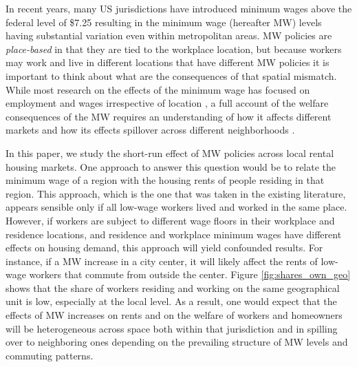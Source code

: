 

In recent years, many US jurisdictions have introduced minimum wages above the 
federal level of \$7.25 resulting in the minimum wage (hereafter MW) levels having substantial 
variation even within metropolitan areas. %
MW policies are \textit{place-based} in that they are tied to the workplace location, but
because workers may work and live in different locations that have different MW policies
it is important to think about what are the consequences of that spatial mismatch.
While most research on the effects of the minimum wage has focused on employment 
and wages irrespective of location 
\parencite[e.g.,][]{CardKrueger1994, AutorEtAl2016, CegnizEtAl2019}, 
a full account of the welfare consequences of the MW requires an 
understanding of how it affects different markets and how its effects spillover 
across different neighborhoods \parencite[as recently emphasized by][]{DubeLindner2021}.

In this paper, we study the short-run effect of MW policies across 
local rental housing markets.
One approach to answer this question would be to relate the minimum wage of a region
with the housing rents of people residing in that region.
This approach, which is the one that was taken in the existing literature, appears 
sensible only if all low-wage workers lived and worked in the same place.
However, if workers are subject to different wage floors in their workplace and
residence locations, and residence and workplace minimum wages have different 
effects on housing demand, this approach will yield confounded results.
For instance, if a MW increase in a city center, it will likely affect 
the rents of low-wage workers that commute from outside the center.
Figure \ref{fig:shares_own_geo} shows that the share of workers residing and working 
on the same geographical unit is low, especially at the local level.
As a result, one would expect that the effects of MW increases on rents and 
on the welfare of workers and homeowners will be heterogeneous across space both within 
that jurisdiction and in spilling over to neighboring ones depending on the prevailing 
structure of MW levels and commuting patterns.

